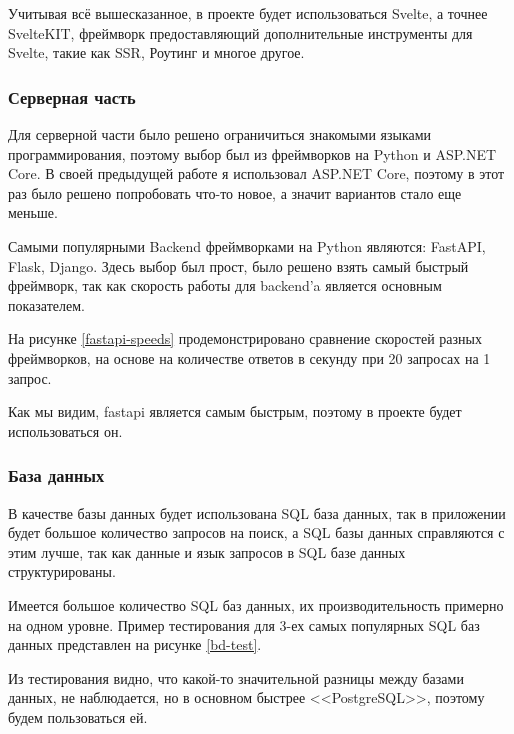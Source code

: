 Учитывая всё вышесказанное, в проекте будет использоваться Svelte, а точнее SvelteKIT, фреймворк предоставляющий дополнительные инструменты для Svelte, такие как SSR, Роутинг и многое другое.

\subsubsection{Серверная часть}

Для серверной части было решено ограничиться знакомыми языками программирования, поэтому выбор был из фреймворков на Python и ASP.NET Core. В своей предыдущей работе я использовал ASP.NET Core, поэтому в этот раз было решено попробовать что-то новое, а значит вариантов стало еще меньше.

Самыми популярными Backend фреймворками на Python являются: FastAPI, Flask, Django. Здесь выбор был прост, было решено взять самый быстрый фреймворк, так как скорость работы для backend'a является основным показателем.

На рисунке \ref{fastapi-speeds} продемонстрировано сравнение скоростей разных фреймворков, на основе на количестве ответов в секунду при 20 запросах на 1 запрос.


Как мы видим, fastapi является самым быстрым, поэтому в проекте будет использоваться он.

\subsubsection{База данных}

В качестве базы данных будет использована SQL база данных, так в приложении будет большое количество запросов на поиск, а SQL базы данных справляются с этим лучше, так как данные и язык запросов в SQL базе данных структурированы.

Имеется большое количество SQL баз данных, их производительность примерно на одном уровне. Пример тестирования для 3-ех самых популярных SQL баз данных представлен на рисунке \ref{bd-test}.


Из тестирования видно, что какой-то значительной разницы между базами данных, не наблюдается, но в основном быстрее <<PostgreSQL>>, поэтому будем пользоваться ей.
